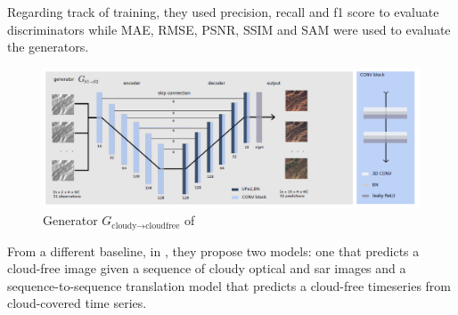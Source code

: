 \documentclass[11pt, a4paper]{article}
\begin{document}
	\\\\
	Regarding track of training, they used precision, recall and f1 score to evaluate discriminators while MAE, RMSE, PSNR, SSIM and SAM were used to evaluate the generators.
	\begin{figure}[H]
		\centering
		\includegraphics[width=13cm]{imgs/relatedwork/sen12mscr-ts-gen-model}
		\caption{Generator $G_{\text{cloudy} \rightarrow \text{cloudfree}}$ of \cite{sen12mscrts}}
		\label{fig:sen12mscrts-gen}
	\end{figure}
	From a different baseline, in \cite{sen12mscrts}, they propose two models: one that predicts a cloud-free image given a sequence of cloudy optical and \gls{sar} images and a sequence-to-sequence translation model that predicts a cloud-free timeseries from cloud-covered time series.
\end{document}
